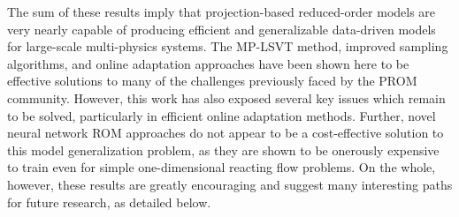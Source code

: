 The sum of these results imply that projection-based reduced-order models are very nearly capable of producing efficient and generalizable data-driven models for large-scale multi-physics systems. The MP-LSVT method, improved sampling algorithms, and online adaptation approaches have been shown here to be effective solutions to many of the challenges previously faced by the PROM community. However, this work has also exposed several key issues which remain to be solved, particularly in efficient online adaptation methods. Further, novel neural network ROM approaches do not appear to be a cost-effective solution to this model generalization problem, as they are shown to be onerously expensive to train even for simple one-dimensional reacting flow problems. On the whole, however, these results are greatly encouraging and suggest many interesting paths for future research, as detailed below.
